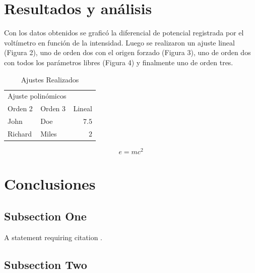 \documentclass[twoside,twocolumn,a4paper]{article}
\begin{document}
\section{Resultados y an\'alisis}

Con los datos obtenidos se grafic\'o la diferencial de potencial registrada por el volt\'imetro en funci\'on de la intensidad. Luego se realizaron un ajuste lineal (Figura 2), uno de orden dos con el origen forzado (Figura 3), uno de orden dos con todos los par\'ametros libres (Figura 4) y finalmente uno de orden tres. 


\blindtext %

\begin{table}
\caption{Ajustes Realizados}
\centering
\begin{tabular}{llr}
\toprule
\multicolumn{2}{c}{Ajuste polin\'omicos} \\
\cmidrule(r){1-2}
Orden 2 & Orden 3 & Lineal\\
\midrule
John & Doe & $7.5$ \\
Richard & Miles & $2$ \\
\bottomrule
\end{tabular}
\end{table}


\begin{equation}
\label{eq:emc}
e = mc^2
\end{equation}

\blindtext %


\section{Conclusiones}

\subsection{Subsection One}

A statement requiring citation \cite{Figueredo:2009dg}.
\blindtext %

\subsection{Subsection Two}

\blindtext %

\end{document}
